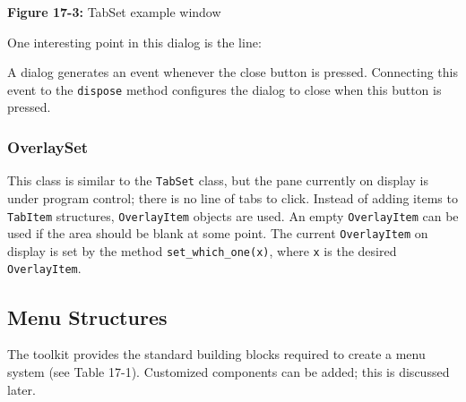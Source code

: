 {\sffamily\bfseries Figure 17-3:}
{\sffamily TabSet example window}

\bigskip

\noindent One interesting point in this dialog is the line:



\noindent A dialog generates an event whenever the close button is
pressed. Connecting this event to the \texttt{dispose}
method configures the dialog to close when this button is
pressed.

\subsubsection[OverlaySet]{OverlaySet}

This class is similar to the
\texttt{TabSet} class, but the pane currently on
display is under program control; there is no line of tabs to click.
Instead of adding items to \texttt{TabItem} structures,
\texttt{OverlayItem} objects are used. An empty \texttt{OverlayItem}
can be used if the area should be blank at some point. The current
\texttt{OverlayItem} on display is set by the method
\texttt{set\_which\_one(x)}, where \texttt{x} is the desired
\texttt{OverlayItem}.

\subsection{Menu Structures}

The toolkit provides the standard building blocks required to create
a menu system (see Table 17-1). Customized components can
be added; this is discussed later.

\bigskip

